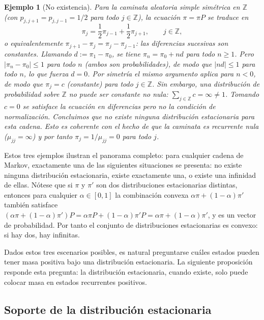 \documentclass[12pt]{book}
\newtheorem{example}{Ejemplo}[chapter]
\begin{document}
\begin{example}[No existencia]
    Para la caminata aleatoria simple simétrica en $\mathbb{Z}$ (con $p_{j,j+1}=p_{j,j-1}=1/2$ para todo $j\in\mathbb{Z}$), la ecuación $\pi = \pi P$ se traduce en
    \[
        \pi_j = \frac{1}{2}\pi_{j-1} + \frac{1}{2}\pi_{j+1}, \qquad j \in \mathbb{Z},
    \]
    o equivalentemente $\pi_{j+1} - \pi_j = \pi_j - \pi_{j-1}$: las diferencias sucesivas son constantes. Llamando $d := \pi_1 - \pi_0$, se tiene $\pi_n = \pi_0 + nd$ para todo $n \ge 1$. Pero $|\pi_n - \pi_0| \le 1$ para todo $n$ (ambos son probabilidades), de modo que $|nd| \le 1$ para todo $n$, lo que fuerza $d = 0$. Por simetría el mismo argumento aplica para $n < 0$, de modo que $\pi_j = c$ (constante) para todo $j \in \mathbb{Z}$. Sin embargo, una distribución de probabilidad sobre $\mathbb{Z}$ no puede ser constante no nula: $\sum_{j\in\mathbb{Z}} c = \infty \neq 1$. Tomando $c=0$ se satisface la ecuación en diferencias pero no la condición de normalización. Concluimos que no existe ninguna distribución estacionaria para esta cadena. Esto es coherente con el hecho de que la caminata es recurrente nula ($\mu_{jj} = \infty$) y por tanto $\pi_j = 1/\mu_{jj} = 0$ para todo $j$.
\end{example}

Estos tres ejemplos ilustran el panorama completo: para cualquier cadena de Markov, exactamente una de las siguientes situaciones se presenta: no existe ninguna distribución estacionaria, existe exactamente una, o existe una infinidad de ellas. Nótese que si $\pi$ y $\pi'$ son dos distribuciones estacionarias distintas, entonces para cualquier $\alpha \in [0,1]$ la combinación convexa $\alpha\pi + (1-\alpha)\pi'$ también satisface $(\alpha\pi + (1-\alpha)\pi')P = \alpha\pi P + (1-\alpha)\pi' P = \alpha\pi + (1-\alpha)\pi'$, y es un vector de probabilidad. Por tanto el conjunto de distribuciones estacionarias es convexo: si hay dos, hay infinitas.

Dados estos tres escenarios posibles, es natural preguntarse cuáles estados pueden tener masa positiva bajo una distribución estacionaria. La siguiente proposición responde esta pregunta: la distribución estacionaria, cuando existe, solo puede colocar masa en estados recurrentes positivos.

\subsection{Soporte de la distribución estacionaria}
\end{document}
